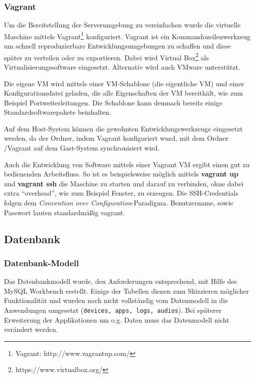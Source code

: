 \subsubsection{Vagrant \label{sec:Vagrant}}
\label{vagrant}
Um die Bereitstellung der Serverumgebung zu vereinfachen wurde die virtuelle Maschine mittels Vagrant\footnote{Vagrant: http://www.vagrantup.com/} konfiguriert. 
Vagrant ist ein Kommandozeilenwerkzeug um schnell reproduzierbare Entwicklungsumgebungen zu schaffen und diese später zu verteilen oder zu exportieren. 
Dabei wird Virtual Box\footnote{https://www.virtualbox.org/} als Virtualisierungssoftware eingesetzt. 
Alternativ wird auch VMware unterstützt. 

Die eigene \ac{VM} wird mittels einer VM-Schablone (die eigentliche VM) und einer Konfigurationsdatei geladen, die alle Eigenschaften der VM bereithält, wie zum Beispiel Portweiterleitungen. 
Die Schablone kann demnach bereits einige Standardsoftwarepakete beinhalten. 

Auf dem Host-System können die gewohnten Entwicklungswerkzeuge eingesetzt werden, da der Ordner, indem Vagrant konfiguriert wurd, mit dem Ordner /Vagrant auf dem Gast-System synchronisiert wird. 

Auch die Entwicklung von Software mittels einer Vagrant VM ergibt einen gut zu bedienenden Arbeitsfluss. 
So ist es beispielsweise möglich mittels \textbf{vagrant up} und \textbf{vagrant ssh} die Maschine zu starten und darauf zu verbinden, ohne dabei extra \enquote{overhead}, wie zum Beispiel Fenster, zu erzeugen. 
Die SSH-Credentials folgen dem \textit{Convention over Configuration}-Paradigma. 
Benutzername, sowie Passwort lauten standardmäßig vagrant. 

\subsection{Datenbank}

\subsubsection{Datenbank-Modell}
Das Datenbankmodell wurde, den Anforderungen entsprechend, mit Hilfe des MySQL Workbench erstellt.
Einige der Tabellen dienen zum Skizzieren möglicher Funktionalität und wurden noch nicht vollständig vom Datenmodell in die Anwendungen umgesetzt (\texttt{devices, apps, logs, audios}).
Bei späterer Erweiterung der Applikationen um o.g. Daten muss das Datenmodell nicht verändert werden.

